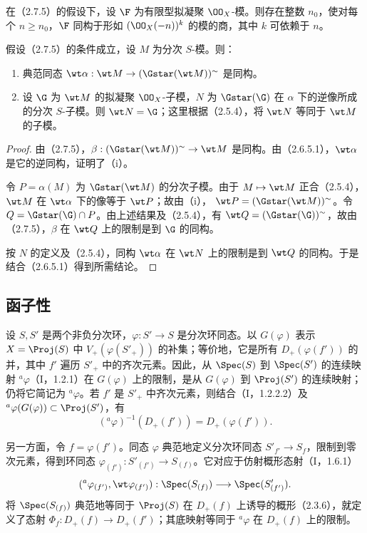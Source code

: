 在（2.7.5）的假设下，设 $\F$ 为有限型拟凝聚 $\OO_X$-模。则存在整数 $n_0$，使对每个 $n\geq n_0$，$\F$ 同构于形如 $(\OO_X(-n))^k$ 的模的商，其中 $k$ 可依赖于 $n$。

假设（2.7.5）的条件成立，设 $M$ 为分次 $S$-模。则：
\begin{enumerate}[label=(\roman*)]
\item 典范同态 $\wt\alpha:\wt M\to(\Gstar(\wt M))^\sim$ 是同构。
\item 设 $\G$ 为 $\wt M$ 的拟凝聚 $\OO_X$-子模，$N$ 为 $\Gstar(\G)$ 在 $\alpha$ 下的逆像所成的分次 $S$-子模。则 $\wt N=\G$；这里根据（2.5.4），将 $\wt N$ 等同于 $\wt M$ 的子模。
\end{enumerate}
\begin{proof}
由（2.7.5），$\beta:(\Gstar(\wt M))^\sim\to\wt M$ 是同构。由（2.6.5.1），$\wt\alpha$ 是它的逆同构，证明了（i）。

令 $P=\alpha(M)$ 为 $\Gstar(\wt M)$ 的分次子模。由于 $M\mapsto\wt M$ 正合（2.5.4），$\wt M$ 在 $\wt\alpha$ 下的像等于 $\wt P$；故由（i），
$\wt P=(\Gstar(\wt M))^\sim$。令 $Q=\Gstar(\G)\cap P$。由上述结果及（2.5.4），有
$\wt Q=(\Gstar(\G))^\sim$，故由（2.7.5），$\beta$ 在 $\wt Q$ 上的限制是到 $\G$ 的同构。

按 $N$ 的定义及（2.5.4），同构 $\wt\alpha$ 在 $\wt N$ 上的限制是到 $\wt Q$ 的同构。于是结合（2.6.5.1）得到所需结论。
\end{proof}

\subsection{函子性}
设 $S,S'$ 是两个非负分次环，$\varphi:S'\to S$ 是分次环同态。以 $G(\varphi)$ 表示
$X=\Proj(S)$ 中 $V_+(\varphi(S'_+))$ 的补集；等价地，它是所有
$D_+(\varphi(f'))$ 的并，其中 $f'$ 遍历 $S'_+$ 中的齐次元素。因此，从 $\Spec(S)$ 到 $\Spec(S')$ 的连续映射 ${}^{a}\varphi$（I，1.2.1）在 $G(\varphi)$ 上的限制，是从 $G(\varphi)$ 到 $\Proj(S')$ 的连续映射；仍将它简记为 ${}^{a}\varphi$。若 $f'$ 是 $S'_+$ 中齐次元素，则结合（I，1.2.2.2）及 ${}^{a}\varphi(G(\varphi))\subset\Proj(S')$，有
\begin{equation}\tag{2.8.1.1}
({}^{a}\varphi)^{-1}(D_+(f'))=D_+(\varphi(f')).
\end{equation}

另一方面，令 $f=\varphi(f')$。同态 $\varphi$ 典范地定义分次环同态
$S'_{f'}\to S_f$，限制到零次元素，得到环同态
$\varphi_{(f')}:S'_{(f')}\to S_{(f)}$。它对应于仿射概形态射（I，1.6.1）
\[
({}^{a}\varphi_{(f')},\wt\varphi_{(f')}):
\Spec(S_{(f)})\longrightarrow\Spec(S'_{(f')}).
\]
将 $\Spec(S_{(f)})$ 典范地等同于 $\Proj(S)$ 在 $D_+(f)$ 上诱导的概形（2.3.6），就定义了态射
$\Phi_f:D_+(f)\to D_+(f')$；其底映射等同于 ${}^{a}\varphi$ 在 $D_+(f)$ 上的限制。

